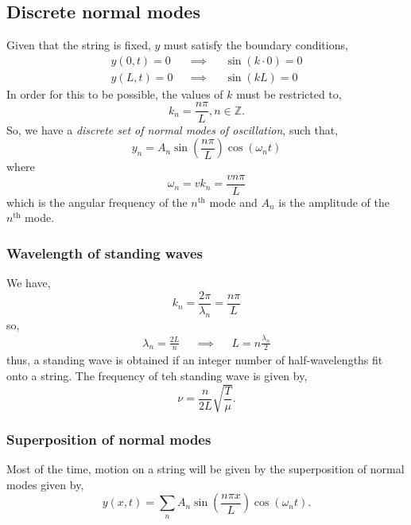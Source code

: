 \documentclass{book}
\begin{document}
\subsection{Discrete normal modes}
Given that the string is fixed, $y$ must satisfy the boundary conditions, 
\begin{align}
	y(0, t) = 0 && \implies && \sin(k\cdot 0) = 0 \label{0cond} \\
	y(L,t) = 0 && \implies && \sin(kL) = 0 \label{lengthconditon}
\end{align}
In order for this to be possible, the values of $k$ must be restricted to,
\begin{equation}
	k_n = \frac{n\pi}{L}, n \in \mathbb{Z}.
\end{equation}
So, we have a \textit{discrete set of normal modes of oscillation}, such that, 
\begin{equation}
	y_n = A_n\sin\left(\frac{n\pi}{L}\right)\cos(\omega_nt)
\end{equation}
where 
\begin{equation}
	\omega_n = v k_n = \frac{vn\pi}{L}
\end{equation}
which is the angular frequency of the $n^{\text{th}}$ mode and $A_n$ is the amplitude of the $n^{\text{th}}$ mode.
\subsubsection{Wavelength of standing waves}
We have,
\begin{equation}
	k_n = \frac{2\pi}{\lambda_n} = \frac{n\pi}{L}
\end{equation}
so,
\begin{align}
	\lambda_n = \frac{2L}{n} && \implies && L = n\frac{\lambda_n}{2}
\end{align}
thus, a standing wave is obtained if an integer number of half-wavelengths fit onto a string. The frequency of teh standing wave is given by,
\begin{equation}
	\nu = \frac{n}{2L}\sqrt{\frac{T}{\mu}}.
\end{equation}
\subsubsection{Superposition of normal modes}
Most of the time, motion on a string will be given by the superposition of normal modes given by,
\begin{equation}
	y(x,t) = \sum_n A_n\sin\left(\frac{n\pi x}{L}\right)\cos(\omega_n t).
\end{equation}
\end{document}
